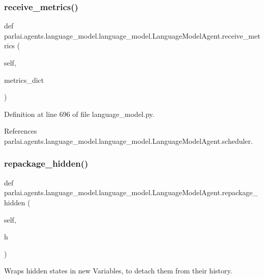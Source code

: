 \subsubsection{\texorpdfstring{receive\+\_\+metrics()}{receive\_metrics()}}
{\footnotesize\ttfamily def parlai.\+agents.\+language\+\_\+model.\+language\+\_\+model.\+Language\+Model\+Agent.\+receive\+\_\+metrics (\begin{DoxyParamCaption}\item[{}]{self,  }\item[{}]{metrics\+\_\+dict }\end{DoxyParamCaption})}



Definition at line 696 of file language\+\_\+model.\+py.



References parlai.\+agents.\+language\+\_\+model.\+language\+\_\+model.\+Language\+Model\+Agent.\+scheduler.

\mbox{\label{classparlai_1_1agents_1_1language__model_1_1language__model_1_1LanguageModelAgent_aa54ff09a8edc6ae51ac8be33aeb4acc8}} 
\subsubsection{\texorpdfstring{repackage\+\_\+hidden()}{repackage\_hidden()}}
{\footnotesize\ttfamily def parlai.\+agents.\+language\+\_\+model.\+language\+\_\+model.\+Language\+Model\+Agent.\+repackage\+\_\+hidden (\begin{DoxyParamCaption}\item[{}]{self,  }\item[{}]{h }\end{DoxyParamCaption})}

\begin{DoxyVerb}Wraps hidden states in new Variables, to detach them from their history.\end{DoxyVerb}
 

